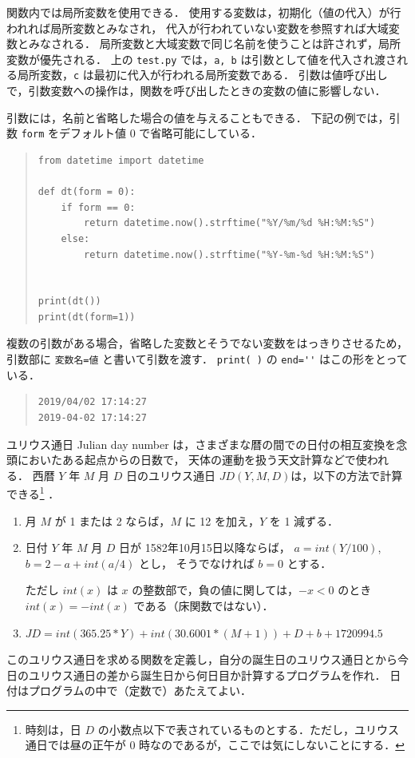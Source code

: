 \documentclass[11pt,a4,epsf]{report}
\begin{document}
関数内では局所変数を使用できる．
使用する変数は，初期化（値の代入）が行われれば局所変数とみなされ，
代入が行われていない変数を参照すれば大域変数とみなされる．
局所変数と大域変数で同じ名前を使うことは許されず，局所変数が優先される．
上の \verb+test.py+ では，\verb+a, b+ は引数として値を代入され渡される局所変数，\verb+c+ は最初に代入が行われる局所変数である．
引数は値呼び出しで，引数変数への操作は，関数を呼び出したときの変数の値に影響しない．

引数には，名前と省略した場合の値を与えることもできる．
下記の例では，引数 \verb+form+ をデフォルト値 0 で省略可能にしている．
\begin{quote}
\small
\begin{verbatim}
from datetime import datetime

def dt(form = 0):
    if form == 0:
        return datetime.now().strftime("%Y/%m/%d %H:%M:%S")
    else:
        return datetime.now().strftime("%Y-%m-%d %H:%M:%S")


print(dt())
print(dt(form=1))
\end{verbatim}
\end{quote}
複数の引数がある場合，省略した変数とそうでない変数をはっきりさせるため，引数部に \verb+変数名=値+ と書いて引数を渡す．
\verb+print( )+ の \verb+end=''+ はこの形をとっている．
\begin{quote}
\small
\begin{verbatim}
2019/04/02 17:14:27
2019-04-02 17:14:27
\end{verbatim}
\end{quote}

\begin{excercise}
ユリウス通日 Julian day number は，さまざまな暦の間での日付の相互変換を念頭においたある起点からの日数で，
天体の運動を扱う天文計算などで使われる．
西暦 $Y$ 年 $M$ 月 $D$ 日のユリウス通日 $\mathit{JD}(Y,M,D)$は，以下の方法で計算できる\footnote{時刻は，日 $D$ の小数点以下で表されているものとする．ただし，ユリウス通日では昼の正午が 0 時なのであるが，ここでは気にしないことにする．} \cite{Meeus-book-98}．
\begin{enumerate}
\item
月 $M$ が 1 または 2 ならば，$M$ に 12 を加え，$Y$ を 1 減ずる．
\item
日付 $Y$ 年 $M$ 月 $D$ 日が 1582年10月15日以降ならば，
$a = int(Y/100)$, $b=2 - a + int(a/4)$ とし，
そうでなければ $b=0$ とする．

ただし $int(x)$ は $x$ の整数部で，負の値に関しては，$-x < 0$ のとき $\mathit{int}(x) = -\mathit{int}(x)$ である（床関数ではない）．
\item
$JD = \mathit{int}(365.25 * Y) + \mathit{int}(30.6001 * (M+1)) + D + b + 1720994.5$
\end{enumerate}

このユリウス通日を求める関数を定義し，自分の誕生日のユリウス通日とから今日のユリウス通日の差から誕生日から何日目か計算するプログラムを作れ．
日付はプログラムの中で（定数で）あたえてよい．
\end{excercise}
\end{document}
